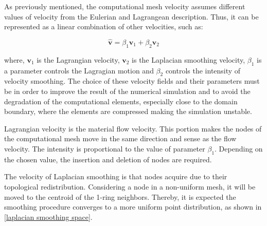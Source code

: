 As previously mentioned, the computational mesh velocity assumes 
different values of velocity from the Eulerian and Lagrangean 
description. Thus, it can be represented as a linear 
combination of other velocities, such as:

\begin{equation}
\hat{\textbf{v}} 
= \beta_{1} \textbf{v}_{1}
+ \beta_{2} \textbf{v}_{2}
\end{equation}

\medskip
\noindent
where,
$\textbf{v}_{1}$ is the Lagrangian velocity,
$\textbf{v}_{2}$ is the Laplacian smoothing velocity,
$\beta_{1}$ is a parameter controls the Lagragian motion and
$\beta_{2}$ controls the intensity of velocity smoothing.
The choice of these velocity fields and their parameters must 
be in order to improve the result of the numerical 
simulation and to avoid the degradation of the 
computational elements, especially close to the domain boundary, 
where the elements are compressed making the simulation unstable.

\medskip
Lagrangian velocity is the material flow velocity. 
This portion makes the nodes of the computational 
mesh move in the same direction and sense as the flow velocity. 
The intensity is proportional to the value of parameter $\beta_{1}$.
Depending on the chosen value, the insertion and deletion 
of nodes are required.

\medskip
The velocity of Laplacian smoothing is that nodes 
acquire due to their topological redistribution. 
Considering a node in a non-uniform mesh, it will be 
moved to the centroid of the 1-ring neighbors. 
Thereby, it is expected the smoothing procedure
converges to a more uniform point distribution,
as shown in \ref{laplacian smoothing space}.

